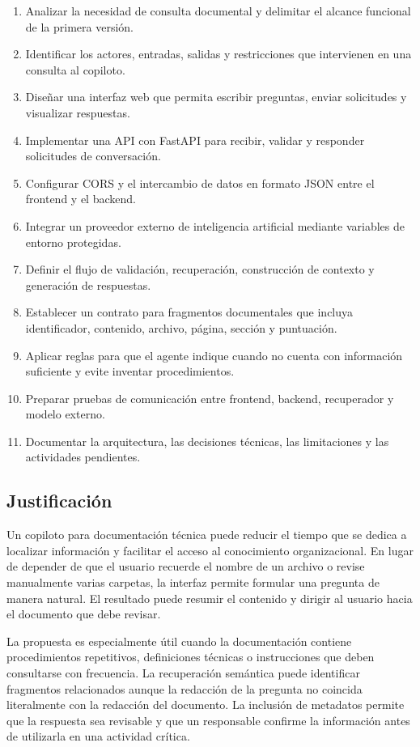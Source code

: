 \begin{enumerate}
    \item Analizar la necesidad de consulta documental y delimitar el alcance funcional de la primera versión.
    \item Identificar los actores, entradas, salidas y restricciones que intervienen en una consulta al copiloto.
    \item Diseñar una interfaz web que permita escribir preguntas, enviar solicitudes y visualizar respuestas.
    \item Implementar una API con FastAPI para recibir, validar y responder solicitudes de conversación.
    \item Configurar CORS y el intercambio de datos en formato JSON entre el frontend y el backend.
    \item Integrar un proveedor externo de inteligencia artificial mediante variables de entorno protegidas.
    \item Definir el flujo de validación, recuperación, construcción de contexto y generación de respuestas.
    \item Establecer un contrato para fragmentos documentales que incluya identificador, contenido, archivo, página, sección y puntuación.
    \item Aplicar reglas para que el agente indique cuando no cuenta con información suficiente y evite inventar procedimientos.
    \item Preparar pruebas de comunicación entre frontend, backend, recuperador y modelo externo.
    \item Documentar la arquitectura, las decisiones técnicas, las limitaciones y las actividades pendientes.
\end{enumerate}

\subsection{Justificación}

Un copiloto para documentación técnica puede reducir el tiempo que se dedica a localizar información y facilitar el acceso al conocimiento organizacional. En lugar de depender de que el usuario recuerde el nombre de un archivo o revise manualmente varias carpetas, la interfaz permite formular una pregunta de manera natural. El resultado puede resumir el contenido y dirigir al usuario hacia el documento que debe revisar.

La propuesta es especialmente útil cuando la documentación contiene procedimientos repetitivos, definiciones técnicas o instrucciones que deben consultarse con frecuencia. La recuperación semántica puede identificar fragmentos relacionados aunque la redacción de la pregunta no coincida literalmente con la redacción del documento. La inclusión de metadatos permite que la respuesta sea revisable y que un responsable confirme la información antes de utilizarla en una actividad crítica.

